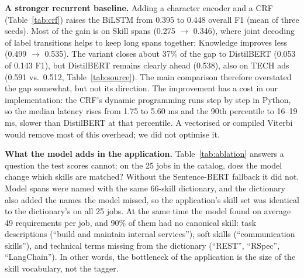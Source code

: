 \documentclass[runningheads]{llncs}
\begin{document}

\textbf{A stronger recurrent baseline.} Adding a character encoder and a CRF (Table~\ref{tab:crf})
raises the BiLSTM from 0.395 to 0.448 overall F1 (mean of three seeds). Most of the gain is on Skill
spans (0.275 $\rightarrow$ 0.346), where joint decoding of label transitions helps to keep long spans
together; Knowledge improves less (0.499 $\rightarrow$ 0.535). The variant closes about 37\% of the gap
to DistilBERT (0.053 of 0.143 F1), but DistilBERT remains clearly ahead (0.538), also on TECH ads
(0.591 vs.\ 0.512, Table~\ref{tab:source}). The main comparison therefore overstated the gap somewhat,
but not its direction. The improvement has a cost in our implementation: the CRF's dynamic programming
runs step by step in Python, so the median latency rises from 1.75 to 5.60 ms and the 90th percentile
to 16--19 ms, slower than DistilBERT at that percentile. A vectorised or compiled Viterbi would remove
most of this overhead; we did not optimise it.

\begin{table}[t]
\centering
\caption{What the model adds over the skill dictionary on the 25 catalog jobs
(\texttt{scripts/ablation\_jobs.py}). ``App'' = model spans + dictionary hits the model missed.}
\label{tab:ablation}

\end{table}

\textbf{What the model adds in the application.} Table~\ref{tab:ablation} answers a question the
test scores cannot: on the 25 jobs in the catalog, does the model change which skills are matched?
Without the Sentence-BERT fallback it did not. Model spans were named with the same 66-skill
dictionary, and the dictionary also added the names the model missed, so the application's skill set
was identical to the dictionary's on all 25 jobs. At the same time the model found on average 49
requirements per job, and 90\% of them had no canonical skill: task descriptions (``build and maintain
internal services''), soft skills (``communication skills''), and technical terms missing from the
dictionary (``REST'', ``RSpec'', ``LangChain''). In other words, the bottleneck of the application is
the size of the skill vocabulary, not the tagger.
\end{document}

